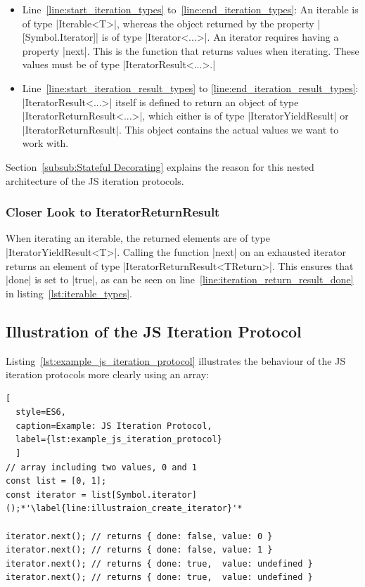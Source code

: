 \begin{itemize}
  \item{Line~\ref{line:start_iteration_types} to~\ref{line:end_iteration_types}: 
      An iterable is of type |Iterable<T>|, whereas the object returned by the property
      |[Symbol.Iterator]| is of type |Iterator<...>|. An iterator requires having a property |next|. 
      This is the function that returns values when iterating. These values must be 
      of type |IteratorResult<...>.|
    }
  \item{Line~\ref{line:start_iteration_result_types} to \ref{line:end_iteration_result_types}:
      |IteratorResult<...>| itself is defined to return an 
      object of type |IteratorReturnResult<...>|, which either is of type
      |IteratorYieldResult| or |IteratorReturnResult|. This object contains the actual 
      values we want to work with.}
\end{itemize}

Section~\ref{subsub:Stateful Decorating} explains the reason for this nested
architecture of the JS iteration protocols.

\subsubsection{Closer Look to IteratorReturnResult}
\label{subsub:Closer look to IteratorReturnResult}
When iterating an iterable, the returned elements are of type
|IteratorYieldResult<T>|. Calling the function |next| on an exhausted iterator
returns an element of type |IteratorReturnResult<TReturn>|. This ensures that
|done| is set to |true|, as can be seen on
line~\ref{line:iteration_return_result_done} in
listing~\ref{lst:iterable_types}.

\subsection{Illustration of the JS Iteration Protocol}
\label{sub:Illustration of the JS Iteration Protocol}
Listing~\ref{lst:example_js_iteration_protocol} illustrates the behaviour of the
JS iteration protocols more clearly using an array:
\begin{lstlisting}[
  style=ES6, 
  caption=Example: JS Iteration Protocol,
  label={lst:example_js_iteration_protocol}
  ]
// array including two values, 0 and 1
const list = [0, 1];
const iterator = list[Symbol.iterator]();*'\label{line:illustraion_create_iterator}'*

iterator.next(); // returns { done: false, value: 0 }
iterator.next(); // returns { done: false, value: 1 }
iterator.next(); // returns { done: true,  value: undefined }
iterator.next(); // returns { done: true,  value: undefined }
\end{lstlisting}

